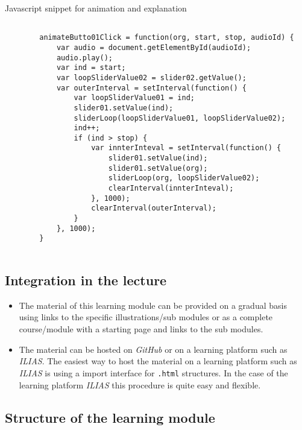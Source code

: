 \documentclass{article}
\begin{document}
\begin{CodeSnippet}[!hp]
	\centering
	\caption{Javascript snippet for animation and explanation}
	\begin{BVerbatim}
		
		animateButto01Click = function(org, start, stop, audioId) {
			var audio = document.getElementById(audioId);
			audio.play();
			var ind = start;
			var loopSliderValue02 = slider02.getValue();
			var outerInterval = setInterval(function() {
				var loopSliderValue01 = ind;
				slider01.setValue(ind);
				sliderLoop(loopSliderValue01, loopSliderValue02);
				ind++;
				if (ind > stop) {
					var innterInteval = setInterval(function() {
						slider01.setValue(ind);
						slider01.setValue(org);
						sliderLoop(org, loopSliderValue02);
						clearInterval(innterInteval);
					}, 1000);
					clearInterval(outerInterval);
				}
			}, 1000);
		}
		
	\end{BVerbatim}
	\vspace*{-2mm}
	\label{CodSni02}
\end{CodeSnippet}

\subsection{Integration in the lecture}

\begin{itemize}
	\item The material of this learning module can be provided on a gradual basis using links to the specific illustrations/sub modules or as a complete course/module with a starting page and links to the sub modules.
	\item The material can be hosted on \emph{GitHub} or on a learning platform such as \emph{ILIAS}. The easiest way to host the material on a learning platform such as \emph{ILIAS} is using a import interface for \texttt{.html} structures. In the case of the learning platform \emph{ILIAS} this procedure is quite easy and flexible.	
\end{itemize}

\subsection{Structure of the learning module}
\end{document}

